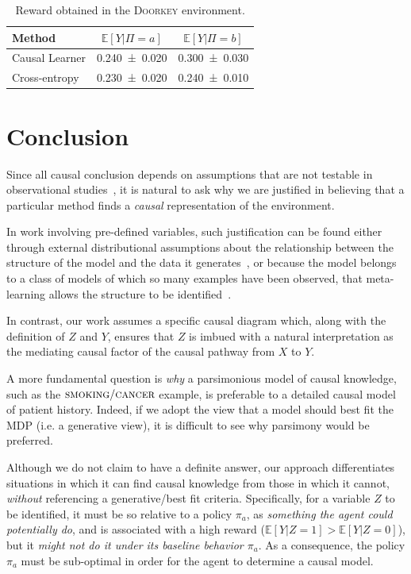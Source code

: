 \documentclass[letterpaper]{article} %
\newcommand{\EE}{\mathbb{E}}
\newcommand{\doorkey}{\textsc{Doorkey}\xspace}
\begin{document}
	\begin{table}
		\centering
\begin{tabular}{ lcc }
	\toprule Method
	&  $\mathbb{E}[Y| \Pi=a ]$
	&  $\mathbb{E}[Y| \Pi=b ]$
	\\ \midrule Causal Learner
	&  \SI{0.240\pm 0.020}{}
	&  \SI{0.300\pm 0.030}{}
	\\  Cross-entropy
	&  \SI{0.230\pm 0.020}{}
	&  \SI{0.240\pm 0.010}{}
	\\ \bottomrule\end{tabular}
		\caption{Reward obtained in the \doorkey environment.}\label{tbl_13}
	\end{table}

	\section{Conclusion} \label{conclusion}
	Since all causal conclusion depends on assumptions that are not testable in observational studies~\cite{pearl2009causal}, it is natural to ask why we are justified in believing that a particular method finds a \emph{causal} representation of the environment.

	In work involving pre-defined variables, such justification can be found either through external distributional assumptions about the relationship between the structure of the model and the data it generates~\cite{spirtes2000causation}, or because the model belongs to a class of models of which so many examples have been observed, that meta-learning allows the structure to be identified~\cite{dasgupta2019causal}.





	In contrast, our work assumes a specific causal diagram which, along with the definition of $Z$ and $Y$, ensures that $Z$ is imbued with a natural interpretation as the mediating causal factor of the causal pathway from $X$ to $Y$.

	A more fundamental question is \emph{why} a parsimonious model of causal knowledge, such as the $\textsc{smoking}/\textsc{cancer}$ example, is preferable to a detailed causal model of patient history. Indeed, if we adopt the view that a model should best fit the MDP (i.e. a generative view), it is difficult to see why parsimony would be preferred.

	Although we do not claim to have a definite answer, our approach differentiates situations in which it can find causal knowledge from those in which it cannot, \emph{without} referencing a generative/best fit criteria. Specifically, for a variable $Z$ to be identified, it must be so relative to a policy $\pi_a$, as \emph{something the agent could potentially do}, and is associated with a high reward ($\EE[Y|Z=1] > \EE[Y|Z=0]$), but it \emph{might not do it under its baseline behavior $\pi_a$}. As a consequence, the policy $\pi_a$ must be sub-optimal in order for the agent to determine a causal model.
\end{document}
